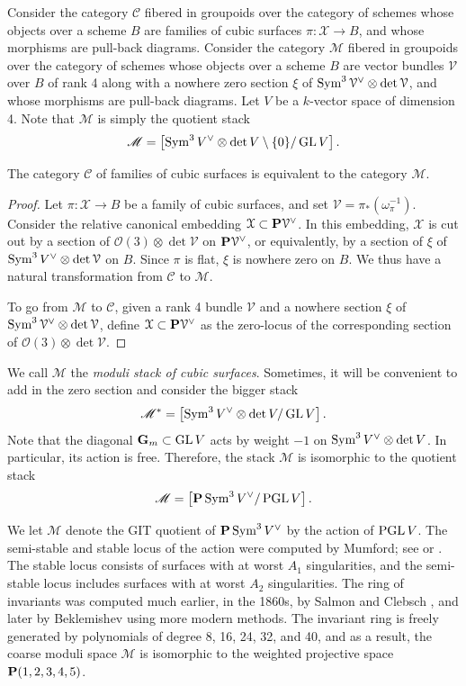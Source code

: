 \documentclass[12pt,reqno]{amsart}
\renewcommand{\k}{k}
\renewcommand{\to}{{\longrightarrow}}
\numberwithin{equation}{section}
\renewcommand{\O}{\mathcal O}
\newcommand{\G}{\mathbf G}
\newcommand{\cX}{\mathcal{X}}
\begin{document}
Consider the category $\mathscr {C}$ fibered in groupoids over the
category of schemes whose objects over a scheme $B$ are families of
cubic surfaces $\pi \colon \cX \to B$, and whose morphisms are pull-back
diagrams.  Consider the category $\mathscr {M}$ fibered in groupoids
over the category of schemes whose objects over a scheme $B$ are
vector bundles $\mathcal V$ over $B$ of rank 4 along with a nowhere
zero section $\xi$ of
$\Sym^3 \mathcal V^\vee \otimes \det \mathcal V$, and whose morphisms
are pull-back diagrams.  Let $V$ be a $\k$-vector space of dimension
4.  Note that $\mathscr{M}$ is simply the quotient stack
\[\mathscr{M} = \left[\Sym^3 V^\vee \otimes \det V \setminus \{0\} / \GL V \right]. \]
\begin{proposition}\label{prop:cubicstack}
  The category $\mathscr{C}$ of families of cubic surfaces is equivalent to the category $\mathscr{M}$.
\end{proposition}
\begin{proof}
  Let $\pi \colon \cX \to B$ be a family of cubic surfaces, and set
  $\mathcal V = \pi_* \left( \omega_{\pi}^{-1} \right)$.  Consider the
  relative canonical embedding $\cX \subset \P \mathcal V^\vee$.  In
  this embedding, $\cX$ is cut out by a section of
  $\O(3) \otimes \det \mathcal V$ on $\P \mathcal V^\vee$, or
  equivalently, by a section of $\xi$ of
  $\Sym^3V^\vee \otimes \det \mathcal V$ on $B$.  Since $\pi$ is flat,
  $\xi$ is nowhere zero on $B$.  We thus have a natural transformation
  from $\mathscr{C}$ to $\mathscr{M}$.

  To go from $\mathscr{M}$ to $\mathscr{C}$, given a rank 4 bundle $\mathcal V$ and a nowhere section $\xi$ of $\Sym^3 \mathcal V^\vee \otimes \det \mathcal V$, define $\cX \subset \P \mathcal V^\vee$ as the zero-locus of the corresponding section of $\O(3) \otimes \det \mathcal V$.
\end{proof}

We call $\mathscr{M}$ the \emph{moduli stack of cubic surfaces}.
Sometimes, it will be convenient to add in the zero section and consider the bigger stack
\[ \mathscr{M}^* = \left[\Sym^3 V^\vee \otimes \det V / \GL V \right].\]
Note that the diagonal $\G_m \subset \GL V$ acts by weight $-1$ on $\Sym^3 V^\vee \otimes \det V$.
In particular, its action is free.
Therefore, the stack $\mathscr{M}$ is isomorphic to the quotient stack
\[ \mathscr{M} = \left[ \P \Sym^3V^\vee / \PGL V \right].\]

We let $\mathcal M$ denote the GIT quotient of $\P \Sym^3V^\vee$ by
the action of $\PGL V$.  The semi-stable and stable locus of the
action were computed by Mumford; see \cite[Chapter 4, \S
2]{mum.fog.kir:94} or \cite[1.14]{mum:77}.  The stable locus consists
of surfaces with at worst $A_1$ singularities, and the semi-stable
locus includes surfaces with at worst $A_2$ singularities.  The ring
of invariants was computed much earlier, in the 1860s, by Salmon
\cite{sal:60} and Clebsch \cite{cle:61,cle:61*1}, and later by
Beklemishev \cite{bek:82} using more modern methods.  The invariant
ring is freely generated by polynomials of degree 8, 16, 24, 32, and
40, and as a result, the coarse moduli space $\mathcal M$ is
isomorphic to the weighted projective space $\P(1,2,3,4,5)$.
\end{document}
